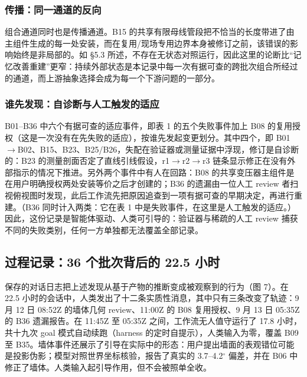 \documentclass[10pt,a4paper]{article}
\begin{document}
\hypertarget{ux4f20ux64adux540cux4e00ux901aux9053ux7684ux53cdux5411}{%
\subsubsection{传播：同一通道的反向}\label{ux4f20ux64adux540cux4e00ux901aux9053ux7684ux53cdux5411}}

组合通道同时也是传播通道。B15
的共享有限母线管段把不恰当的长度带进了由主组件生成的每一处安装，而在复用/现场专用边界本身被修订之前，该错误的影响始终是非局部的。如
§5.3
所述，不存在无状态对照运行，因此这里的论断比``记忆改善重建''更窄：持续外部状态是本记录中每一次有据可查的跨批次组合所经过的通道，而上游抽象选择会成为每一个下游问题的一部分。

\hypertarget{ux8c01ux5148ux53d1ux73b0ux81eaux8bcaux65adux4e0eux4ebaux5de5ux89e6ux53d1ux7684ux9002ux5e94}{%
\subsubsection{谁先发现：自诊断与人工触发的适应}\label{ux8c01ux5148ux53d1ux73b0ux81eaux8bcaux65adux4e0eux4ebaux5de5ux89e6ux53d1ux7684ux9002ux5e94}}

B01--B36 中六个有据可查的适应事件，即表 1 的五个失败事件加上 B08
的复用授权（这是一次没有在先失败的适应），按谁先发起变更划分。其中四个，即
B01\(\rightarrow\)B02、B15、B23、B25/B26，失配在验证器或测量证据中浮现，修订是自诊断的：B23
的测量剖面否定了直线引线假设，r1\(\rightarrow\)r2\(\rightarrow\)r3
链条显示修正在没有外部指示的情况下推进。另外两个事件中有人在回路：B08
的共享变压器主组件是在用户明确授权两处安装等价之后才创建的；B36
的遗漏由一位人工 review
者扫视俯视图时发现，此后工作流先把原因追查到一项有据可查的早期决定，再进行重建。（B36
同时计入两类：它在表 1
中是失败事件，在这里是人工触发的适应。）因此，这份记录是智能体驱动、人类可引导的：验证器与稀疏的人工
review 捕获不同的失败类别，任何一方单独都无法覆盖全部记录。

\hypertarget{ux8fc7ux7a0bux8bb0ux5f5536-ux4e2aux6279ux6b21ux80ccux540eux7684-22.5-ux5c0fux65f6}{%
\subsection{过程记录：36 个批次背后的 22.5
小时}\label{ux8fc7ux7a0bux8bb0ux5f5536-ux4e2aux6279ux6b21ux80ccux540eux7684-22.5-ux5c0fux65f6}}

保存的对话日志把上述发现从基于产物的推断变成被观察到的行为（图 7）。在
22.5 小时的会话中，人类发出了十二条实质性消息，其中只有三条改变了轨迹：9
月 12 日 08:52Z 的墙体几何 review、11:00Z 的 B08 复用授权、9 月 13 日
05:35Z 的 B36 遗漏报告。在 11:45Z 至 05:35Z 之间，工作流无人值守运行了
17.8 小时，共十九次 goal 模式自动续跑（harness
的定时自提示），人类输入为零，覆盖 B09 至
B35。墙体事件还展示了引导在实际中的形态：用户提出墙面的表观错位可能是投影伪影；模型对照世界坐标核验，报告了真实的
3.7--4.2\(^\circ\) 偏差，并在 B06
中修正了墙体。人类输入起引导作用，但不会被照单全收。
\end{document}

